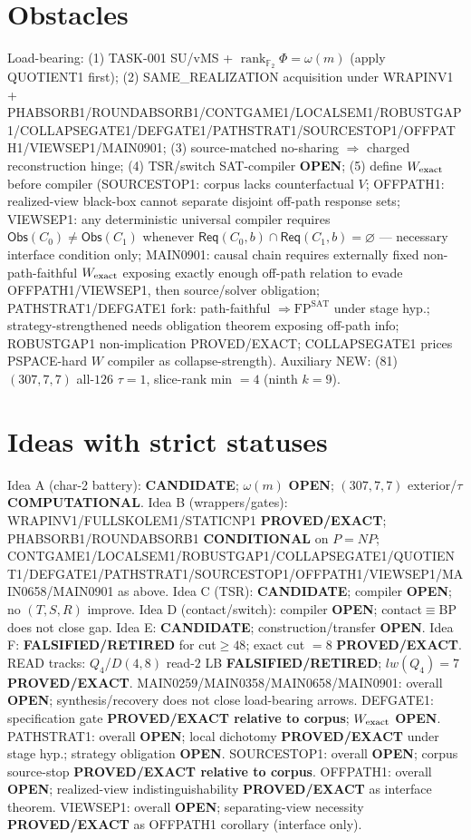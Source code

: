 \documentclass[11pt]{article}
\begin{document}
\section*{Obstacles}
Load-bearing: (1) TASK-001 SU/vMS + $\operatorname{rank}_{\mathbb F_2}\Phi=\omega(m)$ (apply QUOTIENT1 first);
(2) SAME\_REALIZATION acquisition under WRAPINV1 + PHABSORB1/ROUNDABSORB1/CONTGAME1/LOCALSEM1/ROBUSTGAP1/COLLAPSEGATE1/DEFGATE1/PATHSTRAT1/SOURCESTOP1/OFFPATH1/VIEWSEP1/MAIN0901;
(3) source-matched no-sharing $\Rightarrow$ charged reconstruction hinge;
(4) TSR/switch SAT-compiler \textbf{OPEN};
(5) define $W_{\rm exact}$ before compiler (SOURCESTOP1: corpus lacks counterfactual $V$;
OFFPATH1: realized-view black-box cannot separate disjoint off-path response sets;
VIEWSEP1: any deterministic universal compiler requires $\mathsf{Obs}(C_0)\ne\mathsf{Obs}(C_1)$
whenever $\mathsf{Req}(C_0,b)\cap\mathsf{Req}(C_1,b)=\varnothing$ --- necessary interface condition only;
MAIN0901: causal chain requires externally fixed non-path-faithful $W_{\rm exact}$ exposing
exactly enough off-path relation to evade OFFPATH1/VIEWSEP1, then source/solver obligation;
PATHSTRAT1/DEFGATE1 fork: path-faithful $\Rightarrow\mathrm{FP}^{\mathrm{SAT}}$ under stage hyp.;
strategy-strengthened needs obligation theorem exposing off-path info;
ROBUSTGAP1 non-implication PROVED/EXACT; COLLAPSEGATE1 prices PSPACE-hard $W$ compiler as collapse-strength).
Auxiliary NEW: (81) $(307,7,7)$ all-$126$ $\tau{=}1$, slice-rank min $=4$ (ninth $k{=}9$).

\section*{Ideas with strict statuses}
Idea A (char-2 battery): \textbf{CANDIDATE}; $\omega(m)$ \textbf{OPEN}; $(307,7,7)$ exterior/$\tau$ \textbf{COMPUTATIONAL}.
Idea B (wrappers/gates): WRAPINV1/FULLSKOLEM1/STATICNP1 \textbf{PROVED/EXACT};
PHABSORB1/ROUNDABSORB1 \textbf{CONDITIONAL} on $P=NP$;
CONTGAME1/LOCALSEM1/ROBUSTGAP1/COLLAPSEGATE1/QUOTIENT1/DEFGATE1/PATHSTRAT1/SOURCESTOP1/OFFPATH1/VIEWSEP1/MAIN0658/MAIN0901 as above.
Idea C (TSR): \textbf{CANDIDATE}; compiler \textbf{OPEN}; no $(T,S,R)$ improve.
Idea D (contact/switch): compiler \textbf{OPEN}; contact$\equiv$BP does not close gap.
Idea E: \textbf{CANDIDATE}; construction/transfer \textbf{OPEN}.
Idea F: \textbf{FALSIFIED/RETIRED} for cut$\ge48$; exact cut $=8$ \textbf{PROVED/EXACT}.
READ tracks: $Q_4$/$D(4,8)$ read-$2$ LB \textbf{FALSIFIED/RETIRED}; $lw(Q_4)=7$ \textbf{PROVED/EXACT}.
MAIN0259/MAIN0358/MAIN0658/MAIN0901: overall \textbf{OPEN}; synthesis/recovery does not close load-bearing arrows.
DEFGATE1: specification gate \textbf{PROVED/EXACT relative to corpus}; $W_{\rm exact}$ \textbf{OPEN}.
PATHSTRAT1: overall \textbf{OPEN}; local dichotomy \textbf{PROVED/EXACT} under stage hyp.; strategy obligation \textbf{OPEN}.
SOURCESTOP1: overall \textbf{OPEN}; corpus source-stop \textbf{PROVED/EXACT relative to corpus}.
OFFPATH1: overall \textbf{OPEN}; realized-view indistinguishability \textbf{PROVED/EXACT} as interface theorem.
VIEWSEP1: overall \textbf{OPEN}; separating-view necessity \textbf{PROVED/EXACT} as OFFPATH1 corollary (interface only).
\end{document}
